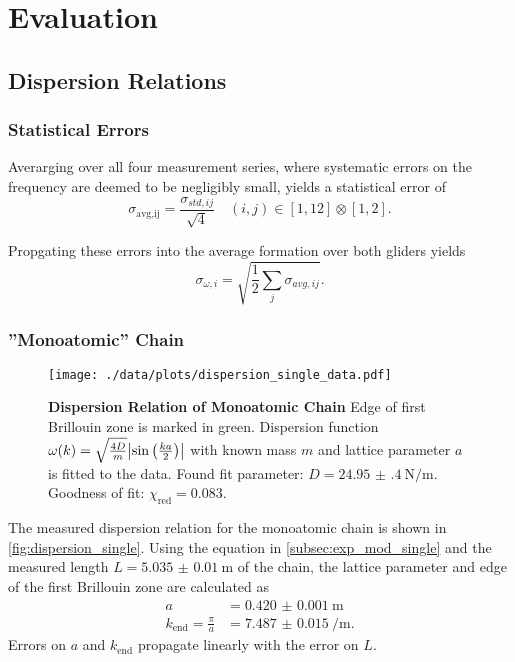 \chapter{Evaluation}

\section{Dispersion Relations}\label{sec:disp_rels}
\subsection{Statistical Errors}
Averarging over all four measurement series, where systematic errors on the frequency are deemed to be negligibly small, yields a statistical error of
\begin{equation*}
	\sigma_\text{avg,ij} = \frac{\sigma_{std,ij}}{\sqrt{4}}\quad (i,j)\in[1, 12]\otimes[1,2].
\end{equation*}

Propgating these errors into the average formation over both gliders yields
\begin{equation*}
	\sigma_{\omega,i} = \sqrt{\frac{1}{2}\sum_{j}\sigma_{avg,ij}}.
\end{equation*}

\subsection{''Monoatomic'' Chain}\label{subsec:disp_mono}
\begin{figure}
	\centering
	\texttt{[image: ./data/plots/dispersion\_single\_data.pdf]}
	\caption[Dispersion Relation of Monoatomic Chain]{\textbf{Dispersion Relation of Monoatomic Chain} Edge of first Brillouin zone is marked in green.
	Dispersion function $\omega(k) = \sqrt{\frac{4D}{m}}\abs{\sin\left(\frac{ka}{2}\right)}$ with known mass $m$ and lattice parameter $a$ is fitted to the data.
	Found fit parameter: $D=\SI{24.95(40)}{\newton\per\meter}$. Goodness of fit: $\chi_\text{red}=\num{0.083}$.}
	\label{fig:dispersion_single}
\end{figure}
The measured dispersion relation for the monoatomic chain is shown in \autoref{fig:dispersion_single}.
Using the equation in \autoref{subsec:exp_mod_single} and the measured length $L=\SI{5.035(10)}{\meter}$ of the chain, the lattice parameter and edge of the first Brillouin zone are calculated as
\begin{align*}
	a &= \SI{0.420(1)}{\meter} \\
	k_\text{end} = \frac{\pi}{a} &= \SI{7.487(15)}{\per\meter}.
\end{align*}
Errors on $a$ and $k_\text{end}$ propagate linearly with the error on $L$.

